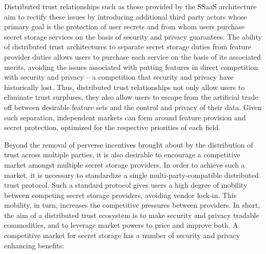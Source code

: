 Distributed trust relationships such as those provided by the SSaaS
architecture aim to rectify these issues by introducing additional
third party actors whose primary goal is the protection of user
secrets and from whom users purchase secret storage services on the
basis of security and privacy guarantees. The ability of distributed
trust architectures to separate secret storage duties from feature
provider duties allows users to purchase each service on the basis of
its associated merits, avoiding the issues associated with putting
features in direct competition with security and privacy -- a
competition that security and privacy have historically lost. Thus,
distributed trust relationships not only allow users to eliminate
trust surpluses, they also allow users to escape from the artificial
trade off between desirable feature sets and the control and privacy
of their data. Given such separation, independent markets can form
around feature provision and secret protection, optimized for the
respective priorities of each field.

Beyond the removal of perverse incentives brought about by the
distribution of trust across multiple parties, it is also desirable to
encourage a competitive market amongst multiple secret storage
providers. In order to achieve such a market, it is necessary to
standardize a single multi-party-compatible distributed trust
protocol. Such a standard protocol gives users a high degree of
mobility between competing secret storage providers, avoiding vendor
lock-in. This mobility, in turn, increases the competitive pressures
between providers. In short, the aim of a distributed trust ecosystem
is to make security and privacy tradable commodities, and to leverage
market powers to price and improve both. A competitive market for
secret storage has a number of security and privacy enhancing
benefits:

